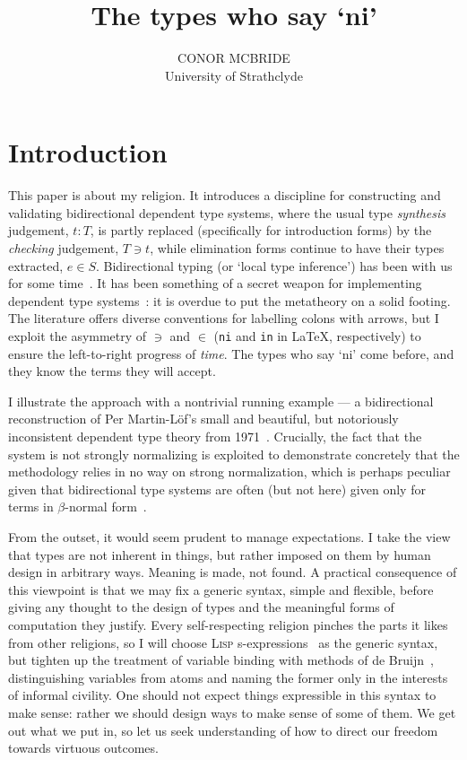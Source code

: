 \documentclass{jfp1}
\newcommand{\bsl}{\texttt{\symbol{92}}}
\begin{document}
\title[Journal of Functional Programming]{The types who say `ni'}
\author[C. McBride]{CONOR MCBRIDE\\
  University of Strathclyde\\
  }
\maketitle

\section{Introduction}

This paper is about my religion. It introduces a discipline for
constructing and validating bidirectional dependent type systems, where the
usual type \emph{synthesis} judgement, $t : T$, is partly replaced
(specifically for introduction forms) by the \emph{checking}
judgement, $T \ni t$, while elimination forms continue to have
their types extracted, $e \in S$. Bidirectional typing (or `local
type inference') has been with us for some
time~\cite{DBLP:journals/toplas/PierceT00}. It has been something of
a secret weapon for implementing dependent type
systems~\cite{DBLP:journals/corr/abs-1202-4905}: it is
overdue to put the metatheory on a solid footing. The
literature offers diverse conventions for labelling colons with
arrows, but I exploit the asymmetry of $\ni$ and $\in$ ({\tt \bsl ni}
and {\tt \bsl in} in \LaTeX, respectively) to ensure the
left-to-right progress of \emph{time}. The types who say `ni' come
before, and they know the terms they will accept.

I illustrate the approach with a nontrivial running example --- a bidirectional reconstruction
of Per Martin-L\"of's small and beautiful, but notoriously
inconsistent dependent type theory from
1971~\cite{martinloef:atheoryoftypes}. Crucially, the fact that the
system is not strongly normalizing is exploited to demonstrate
concretely that the methodology relies in no way on strong
normalization, which is perhaps peculiar given that bidirectional type
systems are often (but not here) given only for terms in
$\beta$-normal form~\cite{DBLP:journals/toplas/PierceT00}.

From the outset, it would seem prudent to manage expectations. I take
the view that types are not inherent in things, but rather imposed on
them by human design in arbitrary ways. Meaning is made, not
found. A practical consequence of this viewpoint is that we may
fix a generic syntax, simple and flexible, before giving any thought
to the design of types and the meaningful forms of computation they
justify. Every self-respecting religion pinches the parts it likes
from other religions, so I will choose \textsc{Lisp} s-expressions~\cite{MCCARTHY60}
as the generic syntax, but tighten up the treatment of variable
binding with methods of de Bruijn~\cite{deBruijn:dummies},
distinguishing variables from atoms and naming the former only in the
interests of informal civility. One should not expect things
expressible in this syntax to make sense: rather we should design
ways to make sense of some of them. We get out what we put
in, so let us seek understanding of how to direct our freedom towards virtuous
outcomes.
\end{document}
